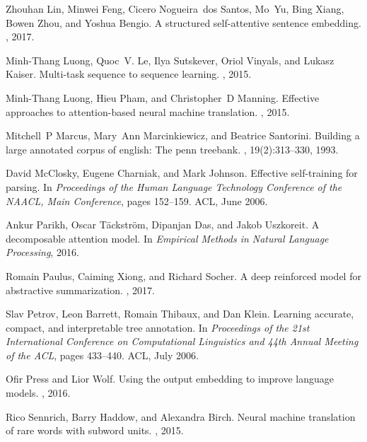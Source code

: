 \documentclass{article}
\begin{document}
\begin{thebibliography}{10}
Zhouhan Lin, Minwei Feng, Cicero Nogueira~dos Santos, Mo~Yu, Bing Xiang, Bowen
  Zhou, and Yoshua Bengio.
\newblock A structured self-attentive sentence embedding.
, 2017.

Minh-Thang Luong, Quoc~V. Le, Ilya Sutskever, Oriol Vinyals, and Lukasz Kaiser.
\newblock Multi-task sequence to sequence learning.
, 2015.

Minh-Thang Luong, Hieu Pham, and Christopher~D Manning.
\newblock Effective approaches to attention-based neural machine translation.
, 2015.

Mitchell~P Marcus, Mary~Ann Marcinkiewicz, and Beatrice Santorini.
\newblock Building a large annotated corpus of english: The penn treebank.
, 19(2):313--330, 1993.

David McClosky, Eugene Charniak, and Mark Johnson.
\newblock Effective self-training for parsing.
\newblock In {\em Proceedings of the Human Language Technology Conference of
  the NAACL, Main Conference}, pages 152--159. ACL, June 2006.

Ankur Parikh, Oscar Täckström, Dipanjan Das, and Jakob Uszkoreit.
\newblock A decomposable attention model.
\newblock In {\em Empirical Methods in Natural Language Processing}, 2016.

Romain Paulus, Caiming Xiong, and Richard Socher.
\newblock A deep reinforced model for abstractive summarization.
, 2017.

Slav Petrov, Leon Barrett, Romain Thibaux, and Dan Klein.
\newblock Learning accurate, compact, and interpretable tree annotation.
\newblock In {\em Proceedings of the 21st International Conference on
  Computational Linguistics and 44th Annual Meeting of the ACL}, pages
  433--440. ACL, July 2006.

Ofir Press and Lior Wolf.
\newblock Using the output embedding to improve language models.
, 2016.

Rico Sennrich, Barry Haddow, and Alexandra Birch.
\newblock Neural machine translation of rare words with subword units.
, 2015.


\end{thebibliography}
\end{document}
